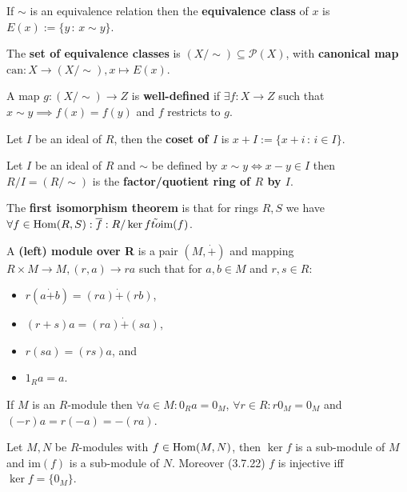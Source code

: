 \begin{multicols}{2}
\begin{definition}
If $\sim$ is an equivalence relation then the \textbf{equivalence class} of $x$ is $E(x):=\{y\,:\,x\sim y\}$.
\end{definition}

\begin{definition}
The \textbf{set of equivalence classes} is $(X/\sim) \subseteq\mathcal{P}(X)$, with \textbf{canonical map} $\mathrm{can:}X\to (X/\sim),x\mapsto E(x)$.

A map $g:(X/\sim)\to Z$ is \textbf{well-defined} if $\exists f:X\to Z$ such that $x\sim y \implies f(x)=f(y)$ and $f$ restricts to $g$.
\end{definition}

\begin{definition}
Let $I$ be an ideal of $R$, then the \textbf{coset of $I$} is $x+I:=\{x+i\,:\,i\in I\}$.
\end{definition}

\begin{definition}
Let $I$ be an ideal of $R$ and $\sim$ be defined by $x\sim y \Leftrightarrow x-y\in I$ then $R/I=(R/\sim)$ is the \textbf{factor/quotient ring of $R$ by $I$}.
\end{definition}

\begin{theorem}
The \textbf{first isomorphism theorem} is that for rings $R,S$ we have $\forall f\in\mathrm{Hom}(R,S): \overline{f}:R/\ker f \tilde{to} \text{im}(f)$.
\end{theorem}

\begin{definition}
A \textbf{(left) module over R} is a pair $(M,\dot{+})$ and mapping $R\times M\to M, (r,a)\to ra$ such that for $a,b\in M$ and $r,s\in R$:
\begin{itemize}
    \item $r(a\dot{+}b) = (ra)\dot{+}(rb)$,
    \item $(r+s)a = (ra)\dot{+}(sa)$,
    \item $r(sa) = (rs)a$, and
    \item $1_Ra = a$.
\end{itemize}
\end{definition}

\begin{theorem}[3.7.8]
If $M$ is an $R$-module then $\forall a\in M: 0_Ra=0_M$, $\forall r\in R: r0_M=0_M$ and $(-r)a=r(-a)=-(ra)$.
\end{theorem}

\begin{theorem}[3.7.21]
Let $M,N$ be $R$-modules with $f\in\mathrm{Hom}(M,N)$, then $\ker f$ is a sub-module of $M$ and $\text{im}(f)$ is a sub-module of $N$. Moreover (3.7.22) $f$ is injective iff $\ker f = \{0_M\}$.
\end{theorem}


\end{multicols}
